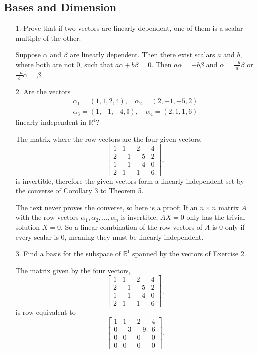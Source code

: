 \documentclass{article}
\begin{document}
\subsection{Bases and Dimension}
\begin{enumerate}[listparindent=\parindent]
\item[1.] Prove that if two vectors are linearly dependent, one of them is a scalar multiple of the other.

    Suppose \(\alpha\) and \(\beta\) are linearly dependent. Then there exist scalars \(a\) and \(b\), where both are not 0,
    such that \(a\alpha + b\beta = 0\). Then \(a\alpha = -b\beta\) and \(\alpha = \frac{-b}{a}\beta\) or \(\frac{-a}{b}\alpha = \beta\).

\item[2.] Are the vectors
    \begin{gather*}
        \alpha_1 = (1, 1, 2, 4),\quad \alpha_2 = (2, -1, -5, 2) \\
        \alpha_3 = (1, -1, -4, 0),\quad \alpha_4 = (2, 1, 1, 6)
    \end{gather*}
    linearly independent in \(\mathbb{R}^4\)?

The matrix where the row vectors are the four given vectors,
\[
    \begin{bmatrix}
        1 & 1 & 2 & 4 \\
        2 & -1 & -5 & 2 \\
        1 & -1 & -4 & 0 \\
        2 & 1 & 1 & 6
    \end{bmatrix},
\]
is invertible, therefore the given vectors form a linearly independent set by the converse of Corollary 3 to Theorem 5.

The text never proves the converse, so here is a proof;
If an \(n \times n\) matrix \(A\) with the row vectors \(\alpha_1, \alpha_2, \dots, \alpha_n\) is invertible,
\(AX = 0\) only has the trivial solution \(X = 0\).
So a linear combination of the row vectors of \(A\) is 0 only if every scalar is 0, meaning they must be linearly independent.

\item[3.] Find a basis for the subspace of \(\mathbb{R}^4\) spanned by the vectors of Exercise 2.

The matrix given by the four vectors,
\[
    \begin{bmatrix}
        1 & 1 & 2 & 4 \\
        2 & -1 & -5 & 2 \\
        1 & -1 & -4 & 0 \\
        2 & 1 & 1 & 6
    \end{bmatrix},
\]
is row-equivalent to
\[
    \begin{bmatrix}
        1 & 1 & 2 & 4 \\
        0 & -3 & -9 & 6 \\
        0 & 0 & 0 & 0 \\
        0 & 0 & 0 & 0
    \end{bmatrix}.
\]


\end{enumerate}
\end{document}
